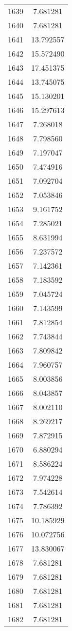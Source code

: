 \documentclass[12pt]{article}
\begin{document}
\begin{longtable}{@{}cc@{}}
1639 & 7.681281 \\
1640 & 7.681281 \\
1641 & 13.792557 \\
1642 & 15.572490 \\
1643 & 17.451375 \\
1644 & 13.745075 \\
1645 & 15.130201 \\
1646 & 15.297613 \\
1647 & 7.268018 \\
1648 & 7.798560 \\
1649 & 7.197047 \\
1650 & 7.474916 \\
1651 & 7.092704 \\
1652 & 7.053846 \\
1653 & 9.161752 \\
1654 & 7.285021 \\
1655 & 8.631994 \\
1656 & 7.237572 \\
1657 & 7.142361 \\
1658 & 7.183592 \\
1659 & 7.045724 \\
1660 & 7.143599 \\
1661 & 7.812854 \\
1662 & 7.743844 \\
1663 & 7.809842 \\
1664 & 7.960757 \\
1665 & 8.003856 \\
1666 & 8.043857 \\
1667 & 8.002110 \\
1668 & 8.269217 \\
1669 & 7.872915 \\
1670 & 6.880294 \\
1671 & 8.586224 \\
1672 & 7.974228 \\
1673 & 7.542614 \\
1674 & 7.786392 \\
1675 & 10.185929 \\
1676 & 10.072756 \\
1677 & 13.830067 \\
1678 & 7.681281 \\
1679 & 7.681281 \\
1680 & 7.681281 \\
1681 & 7.681281 \\
1682 & 7.681281 \\

\end{longtable}
\end{document}
